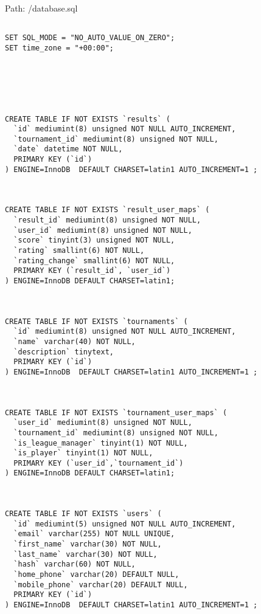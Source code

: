 Path: /database.sql
{\scriptsize
\begin{lstlisting}

SET SQL_MODE = "NO_AUTO_VALUE_ON_ZERO";
SET time_zone = "+00:00";






CREATE TABLE IF NOT EXISTS `results` (
  `id` mediumint(8) unsigned NOT NULL AUTO_INCREMENT,
  `tournament_id` mediumint(8) unsigned NOT NULL,
  `date` datetime NOT NULL,
  PRIMARY KEY (`id`)
) ENGINE=InnoDB  DEFAULT CHARSET=latin1 AUTO_INCREMENT=1 ;



CREATE TABLE IF NOT EXISTS `result_user_maps` (
  `result_id` mediumint(8) unsigned NOT NULL,
  `user_id` mediumint(8) unsigned NOT NULL,
  `score` tinyint(3) unsigned NOT NULL,
  `rating` smallint(6) NOT NULL,
  `rating_change` smallint(6) NOT NULL,
  PRIMARY KEY (`result_id`, `user_id`)
) ENGINE=InnoDB DEFAULT CHARSET=latin1;



CREATE TABLE IF NOT EXISTS `tournaments` (
  `id` mediumint(8) unsigned NOT NULL AUTO_INCREMENT,
  `name` varchar(40) NOT NULL,
  `description` tinytext,
  PRIMARY KEY (`id`)
) ENGINE=InnoDB  DEFAULT CHARSET=latin1 AUTO_INCREMENT=1 ;



CREATE TABLE IF NOT EXISTS `tournament_user_maps` (
  `user_id` mediumint(8) unsigned NOT NULL,
  `tournament_id` mediumint(8) unsigned NOT NULL,
  `is_league_manager` tinyint(1) NOT NULL,
  `is_player` tinyint(1) NOT NULL,
  PRIMARY KEY (`user_id`,`tournament_id`)
) ENGINE=InnoDB DEFAULT CHARSET=latin1;



CREATE TABLE IF NOT EXISTS `users` (
  `id` mediumint(5) unsigned NOT NULL AUTO_INCREMENT,
  `email` varchar(255) NOT NULL UNIQUE,
  `first_name` varchar(30) NOT NULL,
  `last_name` varchar(30) NOT NULL,
  `hash` varchar(60) NOT NULL,
  `home_phone` varchar(20) DEFAULT NULL,
  `mobile_phone` varchar(20) DEFAULT NULL,
  PRIMARY KEY (`id`)
) ENGINE=InnoDB  DEFAULT CHARSET=latin1 AUTO_INCREMENT=1 ;

\end{lstlisting}
}
